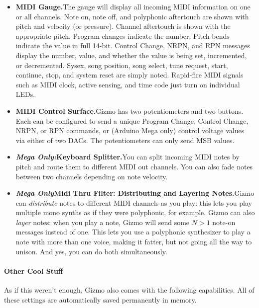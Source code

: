 \documentclass{article}
\begin{document}
\begin{itemize}
\item {\bf MIDI Gauge.}\quad The gauge will display all incoming MIDI information on one or all channels.  Note on, note off, and polyphonic aftertouch are shown with pitch and velocity (or pressure).  Channel aftertouch is shown with the appropriate pitch.  Program changes indicate the number.  Pitch bends indicate the value in full 14-bit.  Control Change, NRPN, and RPN messages display the number, value, and whether the value is being set, incremented, or decremented.  Sysex, song position, song select, tune request, start, continue, stop, and system reset are simply noted.  Rapid-fire MIDI signals such as MIDI clock, active sensing, and time code just turn on individual LEDs.
\item {\bf MIDI Control Surface.}\quad Gizmo has two potentiometers and two buttons.  Each can be configured to send a unique Program Change, Control Change, NRPN, or RPN commands, or (Arduino Mega only) control voltage values via either of two DACs.  The potentiometers can only send MSB values.

\item {\bf \textit{Mega Only:}\quad Keyboard Splitter.}\quad You can split incoming MIDI notes by pitch and route them to different MIDI out channels.  You can also fade notes between two channels depending on note velocity.

\item {\bf \textit{Mega Only}\quad Midi Thru Filter: Distributing and Layering Notes.}\quad Gizmo can {\it distribute} notes to different MIDI channels as you play: this lets you play multiple mono synths as if they were polyphonic, for example.  Gizmo can also {\it layer} notes: when you play a note, Gizmo will send some \(N>1\) note-on messages instead of one.  This lets you use a polyphonic synthesizer to play a note with more than one voice, making it fatter, but not going all the way to unison.  And yes, you can do both simultaneously.

\end{itemize}

\paragraph{Other Cool Stuff}

As if this weren't enough, Gizmo also comes with the following capabilities.  All of these settings are automatically saved permanently in memory.
\end{document}
